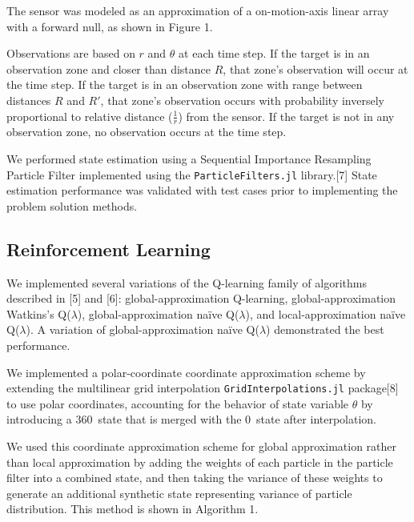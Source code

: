\documentclass{article}
\begin{document}
\par The sensor was modeled as an approximation of a on-motion-axis linear array with a forward null, as shown in Figure 1.
\clearpage

\par Observations are based on $r$ and $\theta$ at each time step. If the target is in an observation zone and closer than distance $R$, that zone's observation will occur at the time step. If the target is in an observation zone with range between distances $R$ and $R'$, that zone’s observation occurs with probability inversely proportional to relative distance ($\frac{1}{r}$) from the sensor. If the target is not in any observation zone, no observation occurs at the time step.

\par We performed state estimation using a Sequential Importance Resampling Particle Filter implemented using the \texttt{ParticleFilters.jl} library.[7] State estimation performance was validated with test cases prior to implementing the problem solution methods.

\subsection{Reinforcement Learning}

\par We implemented several variations of the Q-learning family of algorithms described in [5] and [6]: global-approximation Q-learning, global-approximation Watkins's Q($\lambda$), global-approximation naïve Q($\lambda$), and local-approximation naïve Q($\lambda$). A variation of global-approximation naïve Q($\lambda$) demonstrated the best performance.

\par We implemented a polar-coordinate coordinate approximation scheme by extending the multilinear grid interpolation \texttt{GridInterpolations.jl} package[8] to use polar coordinates, accounting for the behavior of state variable $\theta$ by introducing a 360\textdegree \, state that is merged with the 0\textdegree \, state after interpolation.

\par We used this coordinate approximation scheme for global approximation rather than local approximation by adding the weights of each particle in the particle filter into a combined state, and then taking the variance of these weights to generate an additional synthetic state representing variance of particle distribution. This method is shown in Algorithm 1.
\end{document}
